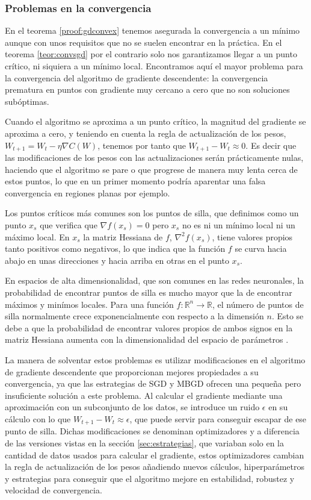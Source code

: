 \subsubsection{Problemas en la convergencia}


En el teorema \ref{proof:gdconvex} tenemos asegurada la convergencia a un mínimo aunque con unos requisitos que no se suelen encontrar en la práctica. En el teorema \ref{teor:convsgd} por el contrario solo nos garantizamos llegar a un punto crítico, ni siquiera a un mínimo local. Encontramos aquí el mayor problema para la convergencia del algoritmo de gradiente descendente: la convergencia prematura en puntos con gradiente muy cercano a cero que no son soluciones subóptimas. 

Cuando el algoritmo se aproxima a un punto crítico, la magnitud del gradiente se aproxima a cero, y teniendo en cuenta la regla de actualización de los pesos, $W_{t+1}=W_t - \eta \nabla C(W)$, tenemos por tanto que $W_{t+1} - W_t \approx 0$. Es decir que las modificaciones de los pesos con las actualizaciones serán prácticamente nulas, haciendo que el algoritmo se pare o que progrese de manera muy lenta cerca de estos puntos, lo que en un primer momento podría aparentar una falsa convergencia en regiones planas por ejemplo. 

Los puntos críticos más comunes son los puntos de silla, que definimos como un punto $x_s$ que verifica que $\nabla f(x_s)=0$ pero $x_s$ no es ni un mínimo local ni un máximo local. En $x_s$ la matriz Hessiana de $f$, $\nabla^2 f(x_s)$, tiene valores propios tanto positivos como negativos, lo que indica que la función $f$ se curva hacia abajo en unas direcciones y hacia arriba en otras en el punto $x_s$.

En espacios de alta dimensionalidad, que son comunes en las redes neuronales, la probabilidad de encontrar puntos de silla es mucho mayor que la de encontrar máximos y minímos locales. Para una función $f:\mathbb{R}^n \rightarrow \mathbb{R}$, el número de puntos de silla normalmente crece exponencialmente con respecto a la dimensión $n$. Esto se debe a que la probabilidad de encontrar valores propios de ambos signos en la matriz Hessiana aumenta con la dimensionalidad del espacio de parámetros \cite{dauphin2014SaddlePoints}. 

La manera de solventar estos problemas es utilizar modificaciones en el algoritmo de gradiente descendente que proporcionan mejores propiedades a su convergencia, ya que las estrategias de SGD y MBGD ofrecen una pequeña pero insuficiente solución a este problema. Al calcular el gradiente mediante una aproximación con un subconjunto de los datos, se introduce un ruido $\epsilon$ en su cálculo con lo que $W_{t+1} - W_t \approx \epsilon$, que puede servir para conseguir escapar de ese punto de silla. Dichas modificaciones se denominan optimizadores y a diferencia de las versiones vistas en la sección \ref{sec:estrategias}, que variaban solo en la cantidad de datos usados para calcular el gradiente, estos optimizadores cambian la regla de actualización de los pesos añadiendo nuevos cálculos, hiperparámetros y estrategias para conseguir que el algoritmo mejore en estabilidad, robustez y velocidad de convergencia.


